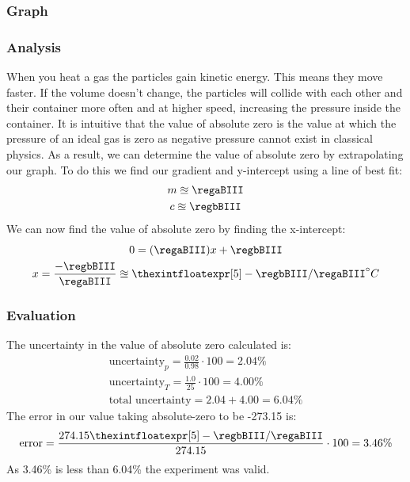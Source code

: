 \subsubsection{Graph}
\begin{figure}[H]
  \centering
\end{figure}

\subsubsection{Analysis}
When you heat a gas the particles gain kinetic energy.
This means they move faster.
If the volume doesn't change, the particles will collide with each other and their container more often and at higher speed, increasing the pressure inside the container.
It is intuitive that the value of absolute zero is the value at which the pressure of an ideal gas is zero as negative pressure cannot exist in classical physics.
As a result, we can determine the value of absolute zero by extrapolating our graph.
To do this we find our gradient and y-intercept using a line of best fit:
\begin{gather}
    m \approxeq \regaBIII \\
    c \approxeq \regbBIII
\end{gather}
We can now find the value of absolute zero by finding the x-intercept:
\begin{gather}
  0 =  (\regaBIII)x+\regbBIII \\
  x = \frac{-\regbBIII}{\regaBIII} \approxeq {\thexintfloatexpr [5] -\regbBIII/\regaBIII \relax} ^\circ C
\end{gather}

\subsubsection{Evaluation}
The uncertainty in the value of absolute zero calculated is:
\begin{gather}
  \text{uncertainty}_{p}=\frac{0.02}{0.98}\cdot 100 = 2.04\% \\
  \text{uncertainty}_{T}=\frac{1.0}{25}\cdot 100 = 4.00\% \\
  \text{total uncertainty}= 2.04 + 4.00 = 6.04\%
\end{gather}
  The error in our value taking absolute-zero to be -273.15 \cite{wiki:absoluteZero} is:
\begin{gather}
  \text{error}=\frac{274.15{\thexintfloatexpr [5] -\regbBIII/\regaBIII \relax}}{274.15}\cdot 100 = 3.46\% \\
\end{gather}
As 3.46\% is less than 6.04\% the experiment was valid.

\newpage
